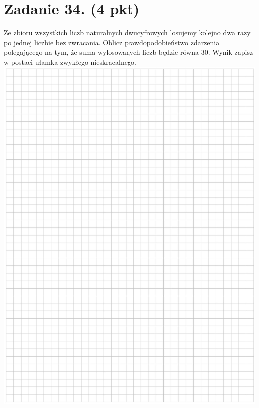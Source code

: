 \documentclass[10pt]{article}
\begin{document}
\section*{Zadanie 34. (4 pkt)}
Ze zbioru wszystkich liczb naturalnych dwucyfrowych losujemy kolejno dwa razy po jednej liczbie bez zwracania. Oblicz prawdopodobieństwo zdarzenia polegającego na tym, że suma wylosowanych liczb będzie równa 30. Wynik zapisz w postaci ułamka zwykłego nieskracalnego.\\
\includegraphics[max width=\textwidth, center]{2024_11_21_779b7f825da3a12753feg-22}\\
\end{document}
